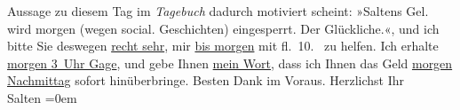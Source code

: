 \begin{ledgroupsized}[t]{13cm}
{{{                  Aussage zu diesem Tag im \emph{Tagebuch} dadurch motiviert scheint: »Saltens Gel. wird morgen (wegen social. Geschichten) eingesperrt. Der
                     Glückliche.«}}}\label{K_L03148-2h}, und ich bitte Sie deswegen \uline{recht sehr}, mir \uline{bis morgen} mit fl. 10.~ zu helfen. Ich erhalte \uline{morgen{ }3 Uhr Gage}, und gebe Ihnen {\pb}\uline{mein Wort}, dass ich Ihnen das Geld \uline{morgen{ }Nachmittag} sofort hinüberbringe.\pend
           \pstart
           Besten Dank im Voraus. Herzlichst Ihr {\\[\baselineskip]}\spacefill\mbox{Salten}\pend
           \leftskip=0em{}
         
         \endnumbering{}\end{ledgroupsized}  \newcommand{\dateiname}{L03148}\newcommand{\titel}{Felix Salten an Arthur Schnitzler, [14?. 1. 1895]}\newcommand{\editorInnen}{Martin Anton Müller und Laura Untner}
      